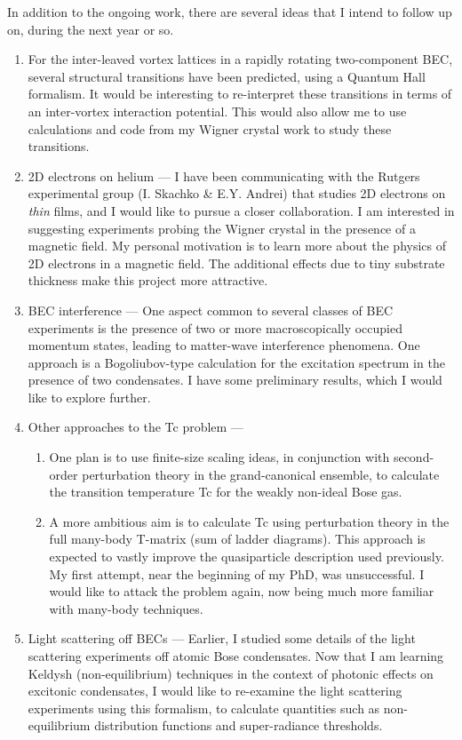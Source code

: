 \documentclass[11pt]{article}
\begin{document}
In addition to the ongoing work, there are several ideas that I intend
to follow up on, during the next year or so.
%
\begin{enumerate}
%
\item For the inter-leaved vortex lattices in a rapidly rotating
two-component BEC, several structural transitions have been predicted,
using a Quantum Hall formalism.  It would be interesting to
re-interpret these transitions in terms of an inter-vortex interaction
potential.  This would also allow me to use calculations and code from
my Wigner crystal work to study these transitions.
%
\item 2D electrons on helium --- 
%
I have been communicating with the Rutgers experimental group
(I. Skachko \& E.Y. Andrei) that studies 2D electrons on \emph{thin}
films, and I would like to pursue a closer collaboration.  I am
interested in suggesting experiments probing the Wigner crystal in the
presence of a magnetic field.  My personal motivation is to learn more
about the physics of 2D electrons in a magnetic field.  The additional
effects due to tiny substrate thickness make this project more
attractive.
%
\item BEC interference ---
%
One aspect common to several classes of BEC experiments is the
presence of two or more macroscopically occupied momentum states,
leading to matter-wave interference phenomena.  One approach is a
Bogoliubov-type calculation for the excitation spectrum in the
presence of two condensates.  I have some preliminary results, which I
would like to explore further.
%
\item Other approaches to the Tc problem --- 
\begin{enumerate}
%
\item One plan is to use finite-size scaling ideas, in conjunction with
second-order perturbation theory in the grand-canonical ensemble, to
calculate the transition temperature Tc for the weakly non-ideal
Bose gas.
%
\item A more ambitious aim is to calculate Tc using perturbation
theory in the full many-body T-matrix (sum of ladder diagrams).
This approach is expected to vastly improve the quasiparticle
description used previously.  My first attempt, near the beginning of
my PhD, was unsuccessful.  I would like to attack the problem again,
now being much more familiar with many-body techniques.
%
\end{enumerate}
%
%
\item Light scattering off BECs --- Earlier, I studied some details of
the light scattering experiments off atomic Bose condensates.  Now
that I am learning Keldysh (non-equilibrium) techniques in the context
of photonic effects on excitonic condensates, I would like to
re-examine the light scattering experiments using this formalism, to
calculate quantities such as non-equilibrium distribution functions
and super-radiance thresholds.
%
\end{enumerate}
\end{document}
